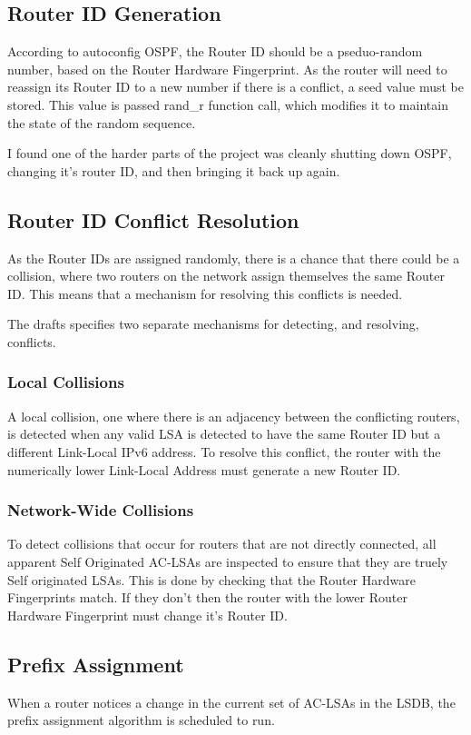 \documentclass[12pt]{report}
\begin{document}
\subsection{Router ID Generation}
According to autoconfig OSPF, the Router ID should be a pseduo-random number,
based on the Router Hardware Fingerprint. As the router will need to reassign
its Router ID to a new number if there is a conflict, a seed value must be
stored. This value is passed rand\_r function call, which modifies it to
maintain the state of the random sequence.

I found one of the harder parts of the project was cleanly shutting down OSPF,
changing it's router ID, and then bringing it back up again. 

\subsection{Router ID Conflict Resolution}
As the Router IDs are assigned randomly, there is a chance that there could be a 
collision, where two routers on the network assign themselves the same Router ID. 
This means that a mechanism for resolving this conflicts is needed. 

The drafts specifies two separate mechanisms for detecting, and resolving, 
conflicts. 

\subsubsection{Local Collisions}
A local collision, one where there is an adjacency between the conflicting routers, 
is detected when any valid LSA is detected to have the same Router ID but a 
different Link-Local IPv6 address. To resolve this conflict, the router with the 
numerically lower Link-Local Address must generate a new Router ID. 

\subsubsection{Network-Wide Collisions}
To detect collisions that occur for routers that are not directly connected, all 
apparent Self Originated AC-LSAs are inspected to ensure that they are truely Self 
originated LSAs. This is done by checking that the Router Hardware Fingerprints 
match. If they don't then the router with the lower Router Hardware Fingerprint must 
change it's Router ID. 

\subsection{Prefix Assignment}
When a router notices a change in the current set of AC-LSAs in the LSDB, the prefix 
assignment algorithm is scheduled to run. 
\end{document}
